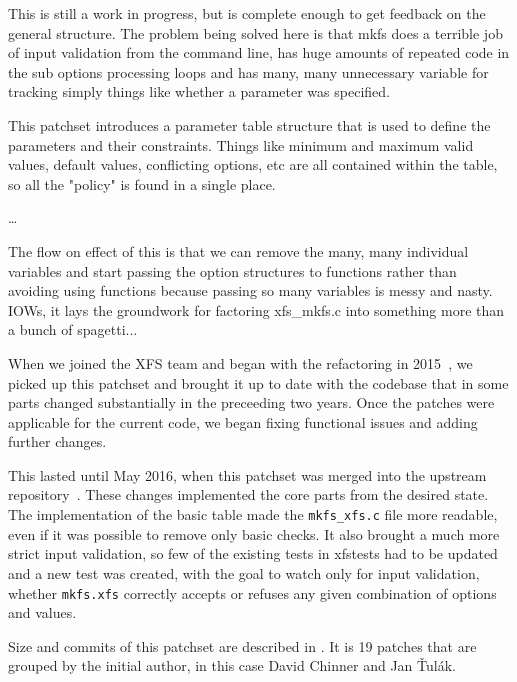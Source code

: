 \begin{displayquote}
This is still a work in progress, but is complete enough to get
feedback on the general structure. The problem being solved here is
that mkfs does a terrible job of input validation from the command
line, has huge amounts of repeated code in the sub options
processing loops and has many, many unnecessary variable for
tracking simply things like whether a parameter was specified.

This patchset introduces a parameter table structure that is used to
define the parameters and their constraints. Things like minimum and
maximum valid values, default values, conflicting options, etc are
all contained within the table, so all the "policy" is found in a
single place.

\ldots

The flow on effect of this is that we can remove the many, many
individual variables and start passing the option structures to
functions rather than avoiding using functions because passing so
many variables is messy and nasty. IOWs, it lays the groundwork for
factoring xfs\_mkfs.c into something more than a bunch of spagetti...
\end{displayquote}

When we joined the XFS team and began with the refactoring in
2015~\cite{myFirstPatches}, we picked up this patchset and brought it up to
date with the codebase that in some parts changed substantially in the
preceeding two years. Once the patches were applicable for the current
code, we began fixing functional issues and adding further changes.


This lasted until May 2016, when this patchset was merged into the upstream
repository~\cite{finalPatchset1,finalPatchset1Announce}.
These changes implemented the core parts from the desired state. The
implementation of the basic table made the {\tt mkfs\_xfs.c} file more
readable, even if it was possible to remove only basic checks. It also
brought a much more strict input validation, so few of the existing tests
in xfstests had to be updated and a new test was created, with the goal to
watch only for input validation, whether {\tt mkfs.xfs} correctly accepts
or refuses any given combination of options and values.

Size and commits of this patchset are described in
. It is 19 patches that are
grouped by the initial author, in this case David Chinner and Jan Ťulák.

